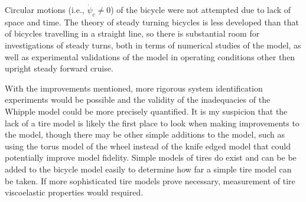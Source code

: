 Circular motions (i.e., $\dot{\psi}_c \ne 0$) of the bicycle were not attempted
due to lack of space and time. The theory of steady turning bicycles is less
developed than that of bicycles travelling in a straight line, so there is
substantial room for investigations of steady turns, both in terms of numerical
studies of the model, as well as experimental validations of the model in
operating conditions other then upright steady forward cruise.

With the improvements mentioned, more rigorous system identification
experiments would be possible and the validity of the inadequacies of the
Whipple model could be more precisely quantified. It is my suspicion that the
lack of a tire model is likely the first place to look when making improvements
to the model, though there may be other simple additions to the model, such as
using the torus model of the wheel instead of the knife edged model that could
potentially improve model fidelity. Simple models of tires do exist and can be
be added to the bicycle model easily to determine how far a simple tire model
can be taken. If more sophisticated tire models prove necessary, measurement of
tire viscoelastic properties would required.

